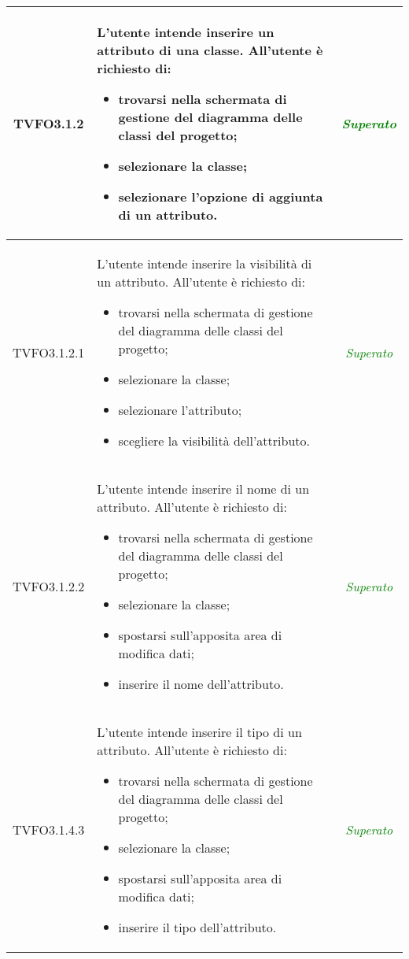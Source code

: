 \begin{longtable}{|c|>{}m{8cm}|c|}
\hypertarget{TVFO3.1.2}{TVFO3.1.2} & L'utente intende inserire un attributo di una classe.
All'utente è richiesto di:
\begin{itemize}
	\item trovarsi nella schermata di gestione del diagramma delle classi del progetto;
	\item selezionare la classe;
	\item selezionare l'opzione di aggiunta di un attributo.
\end{itemize} & \textcolor{Green}{\textit{Superato}}\\ \hline

\hypertarget{TVFO3.1.2.1}{TVFO3.1.2.1} & L'utente intende inserire la visibilità di un attributo.
All'utente è richiesto di:
\begin{itemize}
	\item trovarsi nella schermata di gestione del diagramma delle classi del progetto;
	\item selezionare la classe;
	\item selezionare l'attributo;
	\item scegliere la visibilità dell'attributo.
\end{itemize} & \textcolor{Green}{\textit{Superato}}\\ \hline

\hypertarget{TVFO3.1.2.2}{TVFO3.1.2.2} & L'utente intende inserire il nome di un attributo.
All'utente è richiesto di:
\begin{itemize}
	\item trovarsi nella schermata di gestione del diagramma delle classi del progetto;
	\item selezionare la classe;
	\item spostarsi sull'apposita area di modifica dati; 
	\item inserire il nome dell'attributo.
\end{itemize} & \textcolor{Green}{\textit{Superato}}\\ \hline

\hypertarget{TVFO3.1.4.3}{TVFO3.1.4.3} & L'utente intende inserire il tipo di un attributo.
All'utente è richiesto di:
\begin{itemize}
	\item trovarsi nella schermata di gestione del diagramma delle classi del progetto;
	\item selezionare la classe;
	\item spostarsi sull'apposita area di modifica dati;
	\item inserire il tipo dell'attributo.
\end{itemize} & \textcolor{Green}{\textit{Superato}}\\ \hline


\end{longtable}
